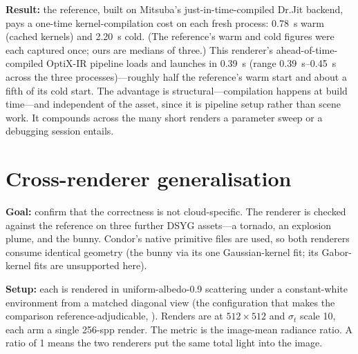 \textbf{Result:} the
reference, built on Mitsuba's just-in-time-compiled Dr.Jit
backend, pays a one-time kernel-compilation cost on each fresh process: \SI{0.78}{\second} warm (cached
kernels) and \SI{2.20}{\second} cold. (The reference's warm and cold figures were each captured once; ours are medians of three.) This renderer's ahead-of-time-compiled OptiX-IR pipeline loads
and launches in \SI{0.39}{\second} (range \SIrange{0.39}{0.45}{\second} across the three
processes)---roughly half the reference's warm start and about a fifth of its
cold start. The advantage is structural---compilation happens at build time---and
independent of the asset, since it is pipeline setup rather than scene work. It compounds
across the many short renders a parameter sweep or a debugging session entails.

\section{Cross-renderer generalisation}
\label{sec:results-generalisation}

\textbf{Goal:} confirm that the correctness is not cloud-specific. The renderer is checked against
the reference on three further DSYG assets---a tornado,
an explosion plume, and the bunny. Condor's native primitive files are used, so both renderers consume identical
geometry (the bunny via its one Gaussian-kernel fit; its Gabor-kernel fits are
unsupported here).

\textbf{Setup:} each is rendered in uniform-albedo-\num{0.9} scattering under a constant-white environment from a matched diagonal
view (the configuration that makes the comparison reference-adjudicable, ).
Renders are at
$512\times512$ and $\sigma_t$ scale \num{10}, each arm a single \num{256}-spp render. The
metric is the image-mean radiance ratio. A ratio of \num{1} means the two renderers put the
same total light into the image.

